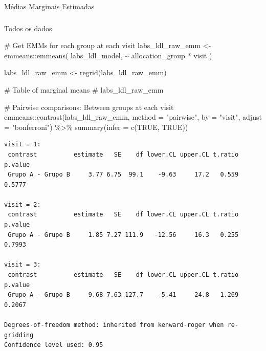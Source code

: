 \documentclass[
  12pt,
]{article}
\makeatletter
\let\oldparagraph\paragraph
\renewcommand{\paragraph}{
    \@ifstar
      \xxxParagraphStar
      \xxxParagraphNoStar
  }
\newcommand{\xxxParagraphStar}[1]{\oldparagraph*{#1}\mbox{}}
\newcommand{\xxxParagraphNoStar}[1]{\oldparagraph{#1}\mbox{}}
\let\oldsubparagraph\subparagraph
\renewcommand{\subparagraph}{
    \@ifstar
      \xxxSubParagraphStar
      \xxxSubParagraphNoStar
  }
\newcommand{\xxxSubParagraphStar}[1]{\oldsubparagraph*{#1}\mbox{}}
\newcommand{\xxxSubParagraphNoStar}[1]{\oldsubparagraph{#1}\mbox{}}
\newenvironment{Shaded}{\begin{snugshade}}{\end{snugshade}}
\newcommand{\AttributeTok}[1]{\textcolor[rgb]{0.40,0.45,0.13}{#1}}
\newcommand{\CommentTok}[1]{\textcolor[rgb]{0.37,0.37,0.37}{#1}}
\newcommand{\ConstantTok}[1]{\textcolor[rgb]{0.56,0.35,0.01}{#1}}
\newcommand{\FunctionTok}[1]{\textcolor[rgb]{0.28,0.35,0.67}{#1}}
\newcommand{\NormalTok}[1]{\textcolor[rgb]{0.00,0.23,0.31}{#1}}
\newcommand{\OtherTok}[1]{\textcolor[rgb]{0.00,0.23,0.31}{#1}}
\newcommand{\SpecialCharTok}[1]{\textcolor[rgb]{0.37,0.37,0.37}{#1}}
\newcommand{\StringTok}[1]{\textcolor[rgb]{0.13,0.47,0.30}{#1}}
\makeatother
\begin{document}
\paragraph{Médias Marginais
Estimadas}\label{muxe9dias-marginais-estimadas-5}

\subparagraph{Todos os dados}\label{todos-os-dados-5}

\begin{Shaded}
\begin{Highlighting}[]
\CommentTok{\# Get EMMs for each group at each visit}
\NormalTok{labs\_ldl\_raw\_emm }\OtherTok{\textless{}{-}}\NormalTok{ emmeans}\SpecialCharTok{::}\FunctionTok{emmeans}\NormalTok{(}
\NormalTok{    labs\_ldl\_model, }
    \SpecialCharTok{\textasciitilde{}}\NormalTok{ allocation\_group }\SpecialCharTok{*}\NormalTok{ visit}
\NormalTok{)}

\NormalTok{labs\_ldl\_raw\_emm }\OtherTok{\textless{}{-}} \FunctionTok{regrid}\NormalTok{(labs\_ldl\_raw\_emm)}

\CommentTok{\# Table of marginal means}
\CommentTok{\# labs\_ldl\_raw\_emm}

\CommentTok{\# Pairwise comparisons: Between groups at each visit}
\NormalTok{emmeans}\SpecialCharTok{::}\FunctionTok{contrast}\NormalTok{(labs\_ldl\_raw\_emm,}
\AttributeTok{method =} \StringTok{"pairwise"}\NormalTok{, }\AttributeTok{by =} \StringTok{"visit"}\NormalTok{,}
\AttributeTok{adjust =} \StringTok{"bonferroni"}\NormalTok{) }\SpecialCharTok{\%\textgreater{}\%} \FunctionTok{summary}\NormalTok{(}\AttributeTok{infer =} \FunctionTok{c}\NormalTok{(}\ConstantTok{TRUE}\NormalTok{, }\ConstantTok{TRUE}\NormalTok{))}
\end{Highlighting}
\end{Shaded}

\begin{verbatim}
visit = 1:
 contrast          estimate   SE    df lower.CL upper.CL t.ratio p.value
 Grupo A - Grupo B     3.77 6.75  99.1    -9.63     17.2   0.559  0.5777

visit = 2:
 contrast          estimate   SE    df lower.CL upper.CL t.ratio p.value
 Grupo A - Grupo B     1.85 7.27 111.9   -12.56     16.3   0.255  0.7993

visit = 3:
 contrast          estimate   SE    df lower.CL upper.CL t.ratio p.value
 Grupo A - Grupo B     9.68 7.63 127.7    -5.41     24.8   1.269  0.2067

Degrees-of-freedom method: inherited from kenward-roger when re-gridding 
Confidence level used: 0.95 
\end{verbatim}
\end{document}

